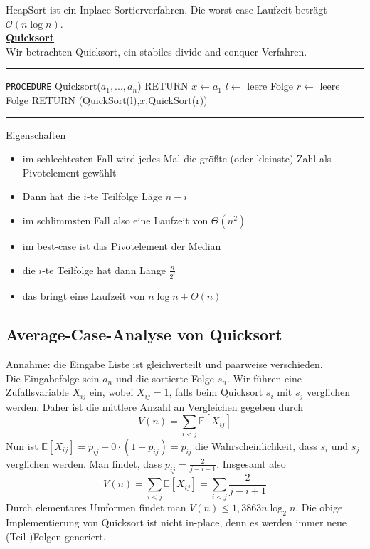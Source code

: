 \documentclass[a4paper, 12pt]{article}
\begin{document}
	HeapSort ist ein Inplace-Sortierverfahren. Die worst-case-Laufzeit beträgt $\mathcal{O}(n\log n)$.\\
	\underline{\textbf{Quicksort}}\\
	Wir betrachten Quicksort, ein stabiles divide-and-conquer Verfahren.
	\par\noindent\rule{\textwidth}{0.4pt}
	\begin{algorithmic}
		\State\texttt{PROCEDURE} Quicksort($a_1,...,a_n$)
			\State RETURN
		\EndIf
		\State $x\gets a_1$
		\State $l \gets$ leere Folge
		\State $r \gets$ leere Folge
			{
			\Else
			\EndIf}
		\EndFor
		\State RETURN (QuickSort(l),$x$,QuickSort(r))
	\end{algorithmic}
	\par\noindent\rule{\textwidth}{0.4pt}
	\underline{Eigenschaften} \begin{itemize}
		\item im schlechtesten Fall wird jedes Mal die größte (oder kleinste) Zahl als Pivotelement gewählt
		\item Dann hat die $i$-te Teilfolge Läge $n-i$
		\item im schlimmsten Fall also eine Laufzeit von $\Theta(n^2)$
		\item im best-case ist das Pivotelement der Median
		\item die $i$-te Teilfolge hat dann Länge $\frac{n}{2^i}$ 
		\item das bringt eine Laufzeit von $n\log n + \Theta(n)$
	\end{itemize}
	\subsection{Average-Case-Analyse von Quicksort}
	Annahme: die Eingabe Liste ist gleichverteilt und paarweise verschieden.\\
	Die Eingabefolge sein $a_n$ und die sortierte Folge $s_n$. Wir führen eine Zufallsvariable $X_{ij}$ ein, wobei $X_{ij} = 1$, falls beim Quicksort $s_i$ mit $s_j$ verglichen werden. Daher ist die mittlere Anzahl an Vergleichen gegeben durch \[V(n) = \sum_{i<j}\mathbb{E}[X_{ij}]\]
	Nun ist $\mathbb{E}[X_{ij}] = p_{ij} + 0\cdot (1-p_{ij}) = p_{ij}$ die Wahrscheinlichkeit, dass $s_i$ und $s_j$ verglichen werden. Man findet, dass $p_{ij} = \frac{2}{j-i+1}$. Insgesamt also \[V(n) = \sum_{i<j} \mathbb{E}[X_{ij}] = \sum_{i<j} \frac{2}{j-i+1}\] Durch elementares Umformen findet man $V(n) \leq 1,3863n \log_2 n$. Die obige Implementierung von Quicksort ist nicht in-place, denn es werden immer neue (Teil-)Folgen generiert.
\end{document}
